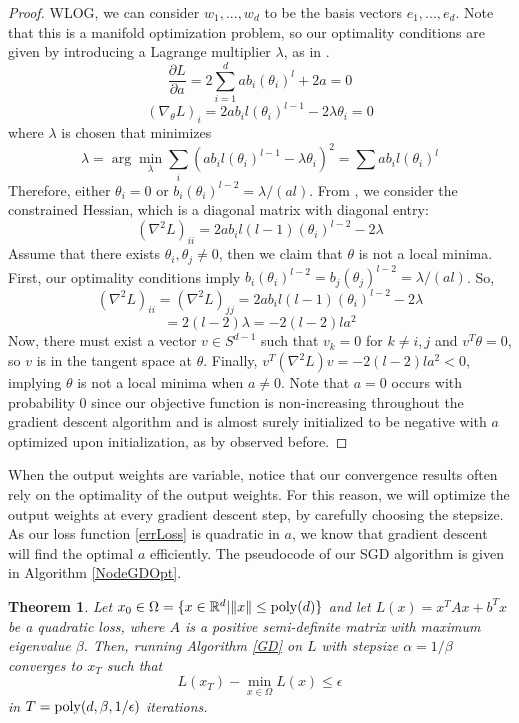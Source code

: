 \documentclass{article}
\newtheorem{theorem}{Theorem}[section]
\newcommand{\R}{{\mathbb{R}}}
\newcommand{\pd}[2]{\frac{\partial#1}{\partial#2}}
\begin{document}
\begin{proof}
WLOG, we can consider $w_1,...,w_d$ to be the basis vectors $e_1,...,e_d$. Note that this is a manifold optimization problem, so our optimality conditions are given by introducing a Lagrange multiplier $\lambda$, as in \cite{GeHJY15}.
\[\pd{L}{a} = 2\sum_{i=1}^d ab_i (\theta_i)^l + 2a = 0\]
\[ (\nabla_\theta L)_i = 2ab_il(\theta_i)^{l-1}  -2\lambda \theta_i = 0 \]
where $\lambda$ is chosen that minimizes 
\[\lambda = \arg \min_\lambda \sum_i (ab_i l (\theta_i)^{l-1} - \lambda\theta_i)^2 = \sum ab_i l (\theta_i)^l \]
Therefore, either $\theta_i = 0$ or $b_i (\theta_i)^{l-2} = \lambda/(al)$. From \cite{GeHJY15}, we consider the constrained Hessian, which is a diagonal matrix with diagonal entry: 
\[(\nabla^2 L)_{ii} = 2a b_i l(l-1)(\theta_i)^{l-2} - 2 \lambda\]
Assume that there exists $\theta_i, \theta_j \neq 0$, then we claim that $\theta$ is not a local minima. First, our optimality conditions imply $b_i(\theta_i)^{l-2} = b_j (\theta_j)^{l-2} = \lambda/(al)$. So,
\[(\nabla^2 L)_{ii} = (\nabla^2L)_{jj} = 2a b_i l(l-1)(\theta_i)^{l-2} - 2 \lambda\]
\[ = 2(l-2)\lambda = -2(l-2)la^2\]
Now, there must exist a vector $v \in S^{d-1}$ such that $v_k = 0$ for $k \neq i,j$ and $v^T\theta = 0$, so $v$ is in the tangent space at $\theta$. Finally, $v^T(\nabla^2 L) v  = -2(l-2)l a^2 < 0$, implying $\theta$ is not a local minima when $a \neq 0$. Note that $a = 0$ occurs with probability 0 since our objective function is non-increasing throughout the gradient descent algorithm and is almost surely initialized to be negative with $a$ optimized upon initialization, as by observed before.
\end{proof}

When the output weights are variable, notice that our convergence results often rely on the optimality of the output weights. For this reason, we will optimize the output weights at every gradient descent step, by carefully choosing the stepsize. As our loss function \eqref{errLoss} is quadratic in $a$, we know that gradient descent will find the optimal $a$ efficiently. The pseudocode of our SGD algorithm is given in Algorithm \ref{NodeGDOpt}. 


%
\begin{theorem}\cite{nesterov2013introductory}\label{quadConverge}
  Let $x_0 \in \Omega = \{ x \in \R^d | \|x \| \leq \poly(d)\}$ and let
  $L(x) = x^TAx + b^Tx$ be a quadratic loss, where $A$ is a positive
  semi-definite matrix with maximum eigenvalue $\beta$. Then, running
  Algorithm \ref{GD} on $L$ with stepsize $\alpha = 1/\beta$ converges
  to $x_T$ such that
  \[L(x_T) - \min_{x \in \Omega} L(x) \leq \epsilon\]
  in $T = \mathrm{poly}(d, \beta, 1/\epsilon)$ iterations.
\end{theorem} 
\end{document}
